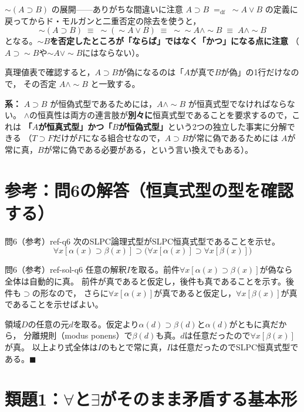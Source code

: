 \documentclass[autodetect-engine,dvi=dvipdfmx,ja=standard]{bxjsarticle}
\begin{document}
\begin{sidebox}[TBorange]{\(\sim(A\supset B)\) の展開——ありがちな間違いに注意}
\(A\supset B\;=_{\mathrm{df}}\;\sim A\lor B\) の定義に戻ってからド・モルガンと二重否定の除去を使うと，
\[
  \sim(A\supset B)\;\equiv\;\sim(\sim A\lor B)\;\equiv\;\sim\sim A\land\sim B\;\equiv\;A\land\sim B
\]
となる。\textbf{\(\sim B\)を否定したところが「ならば」ではなく「かつ」になる点に注意}
（\(A\supset\sim B\)や\(\sim A\lor\sim B\)にはならない）。

真理値表で確認すると，\(A\supset B\)が偽になるのは「\(A\)が真で\(B\)が偽」の1行だけなので，
その否定 \(A\land\sim B\) と一致する。

\medskip
\textbf{系：} \(A\supset B\) が恒偽式型であるためには，\(A\land\sim B\) が恒真式型でなければならない。
\(\land\)の恒真性は両方の連言肢が\textbf{別々に}恒真式型であることを要求するので，これは
\textbf{「\(A\)が恒真式型」かつ「\(B\)が恒偽式型」}という2つの独立した事実に分解できる
（\(T\supset F\)だけが\(F\)になる組合せなので，\(A\supset B\)が常に偽であるためには
\(A\)が常に真，\(B\)が常に偽である必要がある，という言い換えでもある）。
\end{sidebox}

\section{参考：問6の解答（恒真式型の型を確認する）}

\begin{exercise}{問6（参考）}{ref-q6}
次のSLPC論理式型がSLPC恒真式型であることを示せ。
\[
  \forall x[\alpha(x)\supset\beta(x)]\supset\bigl(\forall x[\alpha(x)]\supset\forall x[\beta(x)]\bigr)
\]
\end{exercise}
\begin{solution}{問6（参考）}{ref-sol-q6}
任意の解釈\(I\)を取る。前件\(\forall x[\alpha(x)\supset\beta(x)]\)が偽なら全体は自動的に真。
前件が真であると仮定し，後件も真であることを示す。後件も\(\supset\)の形なので，
さらに\(\forall x[\alpha(x)]\)が真であると仮定し，\(\forall x[\beta(x)]\)が真であることを示せばよい。

領域\(D\)の任意の元\(d\)を取る。仮定より\(\alpha(d)\supset\beta(d)\)と\(\alpha(d)\)がともに真だから，
分離規則（modus ponens）で\(\beta(d)\)も真。\(d\)は任意だったので\(\forall x[\beta(x)]\)が真。
以上より式全体は\(I\)のもとで常に真，\(I\)は任意だったのでSLPC恒真式型である。\hfill\(\blacksquare\)
\end{solution}

\section{類題1：\(\forall\)と\(\exists\)がそのまま矛盾する基本形}
\end{document}
